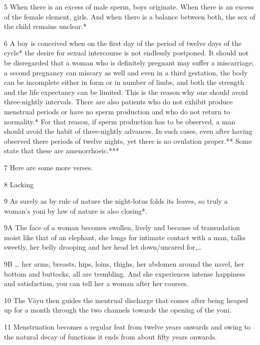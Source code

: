 \begin{translation}
\begin{tt}
\item[5]When there is an excess of male sperm, boys originate. When there is an 
excess of the female element, girls. And when there is a balance between both, 
the sex of the child remains unclear.*

\item[6]A boy is conceived when on the first day of the period of twelve days of 
the cycle* the desire for sexual intercourse is not endlessly postponed. It should 
not be disregarded that a woman who is definitely pregnant may  suffer a 
miscarriage; a second pregnancy can miscary as well and even in a third 
gestation, the body can be incomplete either in form or in number of limbs, and 
both the strength and the life expectancy can be limited. This is the reason why 
one should avoid three-nightly intervals. There are also patients who do not 
exhibit produce menstrual periods or have no sperm production and who do not 
return to normality.* For that reason, if sperm production has to be observed, a 
man should avoid the habit of three-nightly advances. In such cases, even after 
having observed there periods of twelve nights, yet there is no ovulation 
proper.** Some state that these are amenorrhoeic.*** 

\item[7]Here are some more verses.

\item[8] Lacking

\item[9]As surely as by rule of nature the night-lotus folds its leaves, so truly a 
woman’s yoni by law of nature is also closing*.

\item[9A]The face of a woman becomes swollen, lively and because of 
transudation moist like that of an elephant, she longs for intimate contact with a 
man, talks sweetly, her belly drooping and her head let down/uncared for,…

\item[9B]… her arms, breasts, hips, loins, thighs, her abdomen around the navel, 
her bottom and buttocks, all are trembling. And she experiences intense 
happiness and satisfaction, you can tell her a woman after her courses. 

\item[10]The Vāyu then guides the mentrual discharge that comes after being 
heaped up for a month through the two channels towards the opening of the yoni.

\item[11]Menstruation becomes a regular feat from twelve years onwards and 
owing to the natural decay of functions it ends from about fifty years onwards.


\end{tt}
\end{translation}
